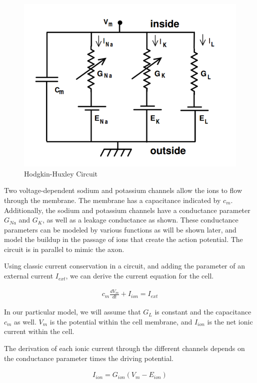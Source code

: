 \documentclass[12]{book}
\newcommand\0{\mathbf{0}}
\newcommand\<{\langle}
\renewcommand\>{\rangle}
\begin{document}
\begin{figure}[H]
    \centering
    \includegraphics[scale=0.5]{hhmodel}
    \caption{Hodgkin-Huxley Circuit}
    \label{fig:my_label}
\end{figure}

Two voltage-dependent sodium and potassium channels allow the ions to flow through the membrane. The membrane has a capacitance indicated by $c_m$. Additionally, the sodium and potassium channels have a conductance parameter $G_{Na}$ and $G_K$, as well as a leakage conductance as shown. These conductance parameters can be modeled by various functions as will be shown later, and model the buildup in the passage of ions that create the action potential. The circuit is in parallel to mimic the axon. 

Using classic current conservation in a circuit, and adding the parameter of an external current $I_{ext}$, we can derive the current equation for the cell.

\begin{align*}
    c_m\frac{dV_m}{dt} + I_{ion} = I_{ext}
\end{align*}

In our particular model, we will assume that $G_L$ is constant and the capacitance $c_m$ as well. $V_m$ is the potential within the cell membrane, and $I_{ion}$ is the net ionic current within the cell.

The derivation of each ionic current through the different channels depends on the conductance parameter times the driving potential.

\begin{align*}
    I_{ion} = G_{ion}(V_{m}-E_{ion})
\end{align*}
\end{document}

